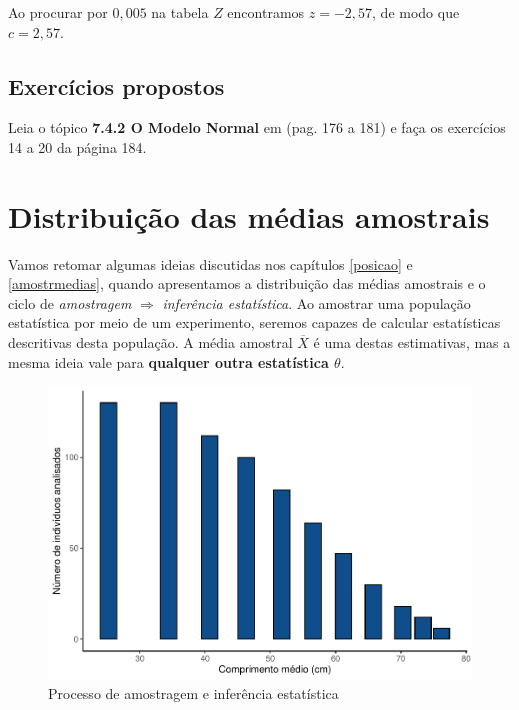 \documentclass[
]{book}
\begin{document}
Ao procurar por \(0,005\) na tabela \(Z\) encontramos \(z = -2,57\), de modo que \(c = 2,57\).

\hypertarget{exercuxedcios-propostos}{%
\section{Exercícios propostos}\label{exercuxedcios-propostos}}

Leia o tópico \textbf{7.4.2 O Modelo Normal} em \citep{bussabemoretin6a} (pag. 176 a 181) e faça os exercícios 14 a 20 da página 184.

\hypertarget{tcl}{%
\chapter{Distribuição das médias amostrais}\label{tcl}}

Vamos retomar algumas ideias discutidas nos capítulos \ref{posicao} e \ref{amostrmedias}, quando apresentamos a distribuição das médias amostrais e o ciclo de \emph{amostragem} \(\Rightarrow\) \emph{inferência estatística}. Ao amostrar uma população estatística por meio de um experimento, seremos capazes de calcular estatísticas descritivas desta população. A média amostral \(\overline{X}\) é uma destas estimativas, mas a mesma ideia vale para \textbf{qualquer outra estatística \(\theta\)}.

\begin{figure}

{\centering \includegraphics[width=20.83in]{probest-cambientais_files/figure-latex/unnamed-chunk-102-1} 

}

\caption{Processo de amostragem e inferência estatística}\label{fig:unnamed-chunk-102}
\end{figure}
\end{document}
